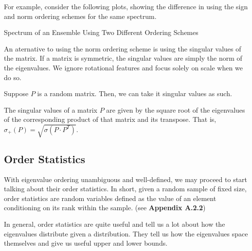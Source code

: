 For example, consider the following plots, showing the difference in using the sign and norm ordering schemes for the same spectrum.

{Spectrum of an Ensemble Using Two Different Ordering Schemes}

\newpage
{}

An aternative to using the norm ordering scheme is using the singular values of the matrix.
If a matrix is symmetric, the singular values are simply the norm of the eigenvalues.
We ignore rotational features and focus solely on scale when we do so.

Suppose $P$ is a random matrix. Then, we can take it singular values as such.

\begin{definition}
The singular values of a matrix $P$ are given by the square root of the eigenvalues of the corresponding product of that matrix and its transpose. That is, $\sigma_+(P) = \sqrt{\sigma(P \cdot P^T)}$.
\end{definition}


\spectrumschemetable

\newpage
\subsection{Order Statistics}


With eigenvalue ordering unambiguous and well-defined, we may proceed to start talking about their order statistics.
In short, given a random sample of fixed size, order statistics are random variables defined as the value of an element conditioning on its rank within the sample. (see \textbf{Appendix A.2.2})

In general, order statistics are quite useful and tell us a lot about how the eigenvalues distribute given a distribution.
They tell us how the eigenvalues space themselves and give us useful upper and lower bounds.

